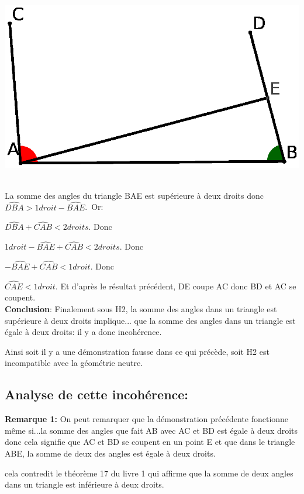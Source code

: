 \documentclass[a4paper, 12pt, twoside]{book}
\begin{document}
 \includegraphics[scale=0.5]{figures/saccH1b.eps} \
 
 
 
 La somme des angles du triangle BAE est supérieure  à deux droits donc $\hat{DBA}>1droit-\hat{BAE}$.\ Or:\
 
 $\hat{DBA}+\hat{CAB}< 2 droits$. Donc\
 
 $1droit-\hat{BAE}+\hat{CAB}< 2 droits$. Donc\
 
 $-\hat{BAE}+\hat{CAB}< 1 droit$. Donc\
 
 $\hat{CAE}< 1  droit$. Et d'après le résultat précédent, DE coupe AC donc BD et AC se coupent. \\
 
 
 
 \textbf{Conclusion}: Finalement sous H2, la somme des angles dans un triangle est supérieure à deux droits implique... que la somme des angles dans un triangle est égale à deux droits: il y a donc incohérence.\
 
  Ainsi soit il y a une démonstration fausse dans ce qui précède, soit H2 est incompatible avec la géométrie neutre.\\
  
 \subsection{Analyse de cette incohérence:}
 

 
 
 \textbf{Remarque 1:} On peut remarquer que la démonstration précédente fonctionne même si...la somme des angles que fait AB avec AC et BD est égale à deux droits donc cela signifie que AC et BD se coupent en un point E et que dans le triangle ABE, la somme de deux des angles est égale à deux droits.\
 
 cela contredit le théorème 17 du livre 1 qui affirme que la somme de deux angles dans un triangle est inférieure à deux droits.\
 
\end{document}
